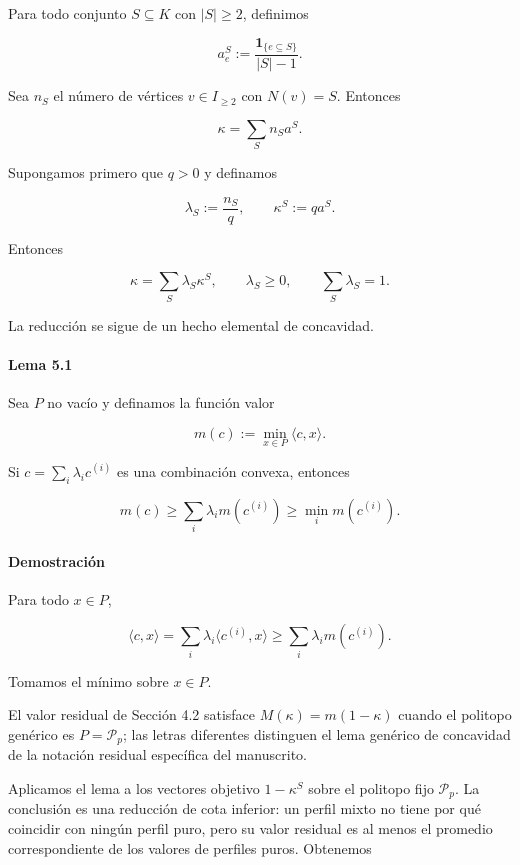 \documentclass[spanish,11pt,a4paper]{article}
\begin{document}
Para todo conjunto \(S\subseteq K\) con \(|S|\ge2\), definimos

\[
a_e^S
:=
\frac{\mathbf1_{\{e\subseteq S\}}}{|S|-1}.
\tag{5.1}
\]

Sea \(n_S\) el número de vértices \(v\in I_{\ge2}\) con \(N(v)=S\).
Entonces

\[
\kappa=\sum_Sn_Sa^S.
\tag{5.2}
\]

Supongamos primero que \(q>0\) y definamos

\[
\lambda_S:=\frac{n_S}{q},
\qquad
\kappa^S:=qa^S.
\]

Entonces

\[
\kappa=\sum_S\lambda_S\kappa^S,
\qquad
\lambda_S\ge0,
\qquad
\sum_S\lambda_S=1.
\tag{5.3}
\]

La reducción se sigue de un hecho elemental de concavidad.

\paragraph{Lema 5.1}\label{lema-5.1}

Sea \(P\) no vacío y definamos la función valor

\[
m(c):=\min_{x\in P}\langle c,x\rangle.
\]

Si \(c=\sum_i\lambda_ic^{(i)}\) es una combinación convexa, entonces

\[
m(c)
\ge
\sum_i\lambda_i m(c^{(i)})
\ge
\min_i m(c^{(i)}).
\]

\paragraph{Demostración}\label{demostraciuxf3n-1}

Para todo \(x\in P\),

\[
\langle c,x\rangle
=
\sum_i\lambda_i\langle c^{(i)},x\rangle
\ge
\sum_i\lambda_i m(c^{(i)}).
\]

Tomamos el mínimo sobre \(x\in P\).

El valor residual de Sección 4.2 satisface \(M(\kappa)=m(1-\kappa)\)
cuando el politopo genérico es \(P=\mathcal P_p\); las letras diferentes
distinguen el lema genérico de concavidad de la notación residual
específica del manuscrito.

Aplicamos el lema a los vectores objetivo \(1-\kappa^S\) sobre el
politopo fijo \(\mathcal P_p\). La conclusión es una reducción de cota
inferior: un perfil mixto no tiene por qué coincidir con ningún perfil
puro, pero su valor residual es al menos el promedio correspondiente de
los valores de perfiles puros. Obtenemos
\end{document}
